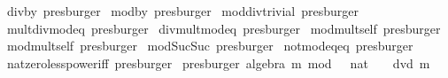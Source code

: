\begin{isabellebody}
\isamarkupfalse%
\ div{\isacharunderscore}{\kern0pt}by{\isacharunderscore}{\kern0pt}{}\ {\isacharbrackleft}{\kern0pt}presburger{\isacharbrackright}{\kern0pt}\isanewline
{}\isamarkupfalse%
\ mod{\isacharunderscore}{\kern0pt}by{\isacharunderscore}{\kern0pt}{}\ {\isacharbrackleft}{\kern0pt}presburger{\isacharbrackright}{\kern0pt}\isanewline
{}\isamarkupfalse%
\ mod{\isacharunderscore}{\kern0pt}div{\isacharunderscore}{\kern0pt}trivial\ {\isacharbrackleft}{\kern0pt}presburger{\isacharbrackright}{\kern0pt}\isanewline
{}\isamarkupfalse%
\ mult{\isacharunderscore}{\kern0pt}div{\isacharunderscore}{\kern0pt}mod{\isacharunderscore}{\kern0pt}eq\ {\isacharbrackleft}{\kern0pt}presburger{\isacharbrackright}{\kern0pt}\isanewline
{}\isamarkupfalse%
\ div{\isacharunderscore}{\kern0pt}mult{\isacharunderscore}{\kern0pt}mod{\isacharunderscore}{\kern0pt}eq\ {\isacharbrackleft}{\kern0pt}presburger{\isacharbrackright}{\kern0pt}\isanewline
{}\isamarkupfalse%
\ mod{\isacharunderscore}{\kern0pt}mult{\isacharunderscore}{\kern0pt}self{}\ {\isacharbrackleft}{\kern0pt}presburger{\isacharbrackright}{\kern0pt}\isanewline
{}\isamarkupfalse%
\ mod{\isacharunderscore}{\kern0pt}mult{\isacharunderscore}{\kern0pt}self{}\ {\isacharbrackleft}{\kern0pt}presburger{\isacharbrackright}{\kern0pt}\isanewline
{}\isamarkupfalse%
\ mod{}{\isacharunderscore}{\kern0pt}Suc{\isacharunderscore}{\kern0pt}Suc\ {\isacharbrackleft}{\kern0pt}presburger{\isacharbrackright}{\kern0pt}\isanewline
{}\isamarkupfalse%
\ not{\isacharunderscore}{\kern0pt}mod{\isacharunderscore}{\kern0pt}{}{\isacharunderscore}{\kern0pt}eq{\isacharunderscore}{\kern0pt}{}{\isacharunderscore}{\kern0pt}eq{\isacharunderscore}{\kern0pt}{}\ {\isacharbrackleft}{\kern0pt}presburger{\isacharbrackright}{\kern0pt}\ \isanewline
{}\isamarkupfalse%
\ nat{\isacharunderscore}{\kern0pt}zero{\isacharunderscore}{\kern0pt}less{\isacharunderscore}{\kern0pt}power{\isacharunderscore}{\kern0pt}iff\ {\isacharbrackleft}{\kern0pt}presburger{\isacharbrackright}{\kern0pt}\isanewline
\isanewline
{}\isamarkupfalse%
\ {\isacharbrackleft}{\kern0pt}presburger{\isacharcomma}{\kern0pt}\ algebra{\isacharbrackright}{\kern0pt}{\isacharcolon}{\kern0pt}\ {\isachardoublequoteopen}m\ mod\ {}\ {\isacharequal}{\kern0pt}\ {\isacharparenleft}{\kern0pt}{}{\isacharcolon}{\kern0pt}{\isacharcolon}{\kern0pt}nat{\isacharparenright}{\kern0pt}\ {\isasymlongleftrightarrow}\ {\isasymnot}\ {}\ dvd\ m\ {\isachardoublequoteclose}%

\end{isabellebody}

